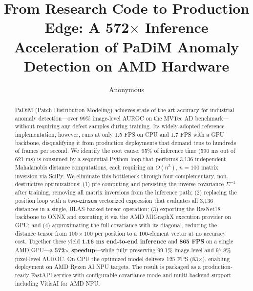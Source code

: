 \documentclass[blind]{gtac}
\title{From Research Code to Production Edge: A 572$\times$ Inference
Acceleration of PaDiM Anomaly Detection on AMD Hardware}
\author{Anonymous}
\begin{document}
\maketitle

\pagestyle{fancy}
\fancyhf{}
\cfoot{\thepage}
\renewcommand{\headrulewidth}{0pt}
\thispagestyle{fancy}

\begin{abstract}
PaDiM (Patch Distribution Modeling) achieves state-of-the-art accuracy for
industrial anomaly detection---over 99\% image-level AUROC on the MVTec AD
benchmark---without requiring any defect samples during training.  Its
widely-adopted reference implementation, however, runs at only 1.5 FPS on CPU
and 1.7 FPS with a GPU backbone, disqualifying it from production deployments
that demand tens to hundreds of frames per second.  We identify the root cause:
95\% of inference time (590 ms out of 621 ms) is consumed by a sequential
Python loop that performs 3{,}136 independent Mahalanobis distance computations,
each requiring an $O(n^3)$, $n\!=\!100$ matrix inversion via SciPy.  We
eliminate this bottleneck through four complementary, non-destructive
optimizations: (1) pre-computing and persisting the inverse covariance
$\Sigma^{-1}$ after training, removing all matrix inversions from the inference
path; (2) replacing the position loop with a two-\texttt{einsum} vectorized
expression that evaluates all 3{,}136 distances in a single, BLAS-backed tensor
operation; (3) exporting the ResNet18 backbone to ONNX and executing it via the
AMD MIGraphX execution provider on GPU; and (4) approximating the full
covariance with its diagonal, reducing the distance tensor from
$100\!\times\!100$ per position to a 100-element vector at no accuracy cost.
Together these yield \textbf{1.16 ms end-to-end inference} and \textbf{865 FPS}
on a single AMD GPU---a \textbf{572$\times$ speedup}---while fully preserving
99.1\% image-level and 97.8\% pixel-level AUROC.  On CPU the optimized model
delivers 125 FPS (83$\times$), enabling deployment on AMD Ryzen AI NPU targets.
The result is packaged as a production-ready FastAPI service with configurable
covariance mode and multi-backend support including VitisAI for AMD NPU.
\end{abstract}

\end{document}
